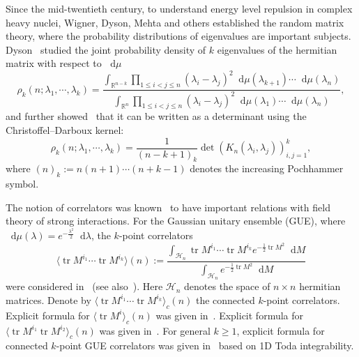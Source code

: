 \documentclass[a4paper]{article}
\theoremstyle{plain}
\theoremstyle{definition}
\newcommand{\dif}{\mathop{}\!\mathrm{d}}
\newcommand{\RR}{\mathbb{R}}
\DeclareMathOperator{\tr}{tr}
\begin{document}
Since the mid-twentieth century, to understand energy level repulsion in complex heavy nuclei, Wigner, Dyson, Mehta and others established the random matrix theory, where the probability distributions of eigenvalues are important subjects. Dyson~\cite{Dyson1962} studied the joint probability density of $k$ eigenvalues of the hermitian matrix with respect to $\dif\mu$
\begin{equation}
	\rho_k(n;\lambda_1,\cdots,\lambda_k)=\frac{\int_{\RR^{n-k}}\prod_{1\le i<j\le n}(\lambda_i-\lambda_j)^2\dif\mu(\lambda_{k+1})\cdots\dif\mu(\lambda_n)}{\int_{\RR^n} \prod_{1\le i<j\le n}(\lambda_i-\lambda_j)^2\dif\mu(\lambda_1)\cdots\dif\mu(\lambda_n)},
\end{equation} and further showed~\cite{Dyson1970} that it can be written as a determinant using the Christoffel--Darboux kernel:
	\begin{equation} \label{dpp}
			\rho_k(n;\lambda_1,\cdots,\lambda_k)=\frac{1}{(n-k+1)_k}\det(K_n(\lambda_i,\lambda_j))_{i,j=1}^{k},
		\end{equation}
	where $(n)_k:=n(n+1)\cdots(n+k-1)$ denotes the increasing Pochhammer symbol.


The notion of correlators was known~\cite{thooft1,thooft2} to have important relations with field theory of strong interactions. For the Gaussian unitary ensemble (GUE), where $\dif\mu(\lambda)=e^{-\frac{\lambda^2}{2}}\dif\lambda$, the $k$-point correlators
\begin{equation}
	\langle\tr M^{i_1}\cdots\tr M^{i_k}\rangle(n):=\frac{\int_{\mathcal H_n}\tr M^{i_1}\cdots\tr M^{i_k}e^{-\frac{1}{2}\tr M^2}\dif M}{\int_{\mathcal H_n}e^{-\frac{1}{2}\tr M^2}\dif M}
\end{equation}
were considered in~\cite{BIPZ,BIZ,HZ} (see also~\cite{Mehta,Deift}). Here $\mathcal H_n$ denotes the space of $n\times n$ hermitian matrices. Denote by $\langle\tr M^{i_1}\cdots\tr M^{i_k}\rangle_c(n)$ the connected $k$-point correlators. Explicit formula for $\langle\tr M^{i}\rangle_c(n)$ was given in~\cite{HZ}. Explicit formula for $\langle\tr M^{i_1}\tr M^{i_2}\rangle_c(n) $ was given in~\cite{MS}. For general $k\ge1$, explicit formula for connected $k$-point GUE correlators was given in~\cite{DY} based on 1D Toda integrability.
\end{document}

